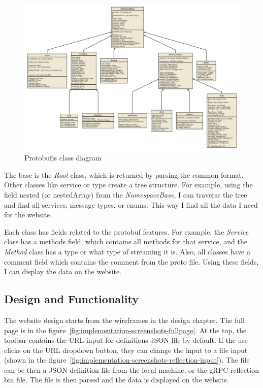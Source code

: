 \begin{landscape}
    \begin{figure}
        \centering
        \captionsetup{justification=centering}
        \includegraphics[width=0.75\paperheight]{images/implementation/protobufjs-class-diagram}
        \caption{Protobufjs class diagram~\cite{protobufjs}}
        \label{fig:protobufjs-class-diagram}
    \end{figure}
\end{landscape}

The base is the \textit{Root} class, which is returned by parsing the common format.
Other classes like service or type create a tree structure.
For example, using the field nested (or nestedArray) from the \textit{NamespaceBase}, I can traverse the tree and find all services, message types, or enums.
This way I find all the data I need for the website.

Each class has fields related to the protobuf features.
For example, the \textit{Service} class has a methods field, which contains all methods for that service, and the \textit{Method} class has a type or what type of streaming it is.
Also, all classes have a comment field which contains the comment from the proto file.
Using these fields, I can display the data on the website.

\subsection{Design and Functionality}
The website design starts from the wireframes in the design chapter.
The full page is in the figure~\ref{fig:implementation-screenshots-fullpage}.
At the top, the toolbar contains the URL input for definitions JSON file by default.
If the use clicks on the URL dropdown button, they can change the input to a file input (shown in the figure~\ref{fig:implementation-screenshots-reflection-input}).
The file can be then a JSON definition file from the local machine, or the gRPC reflection bin file.
The file is then parsed and the data is displayed on the website.

